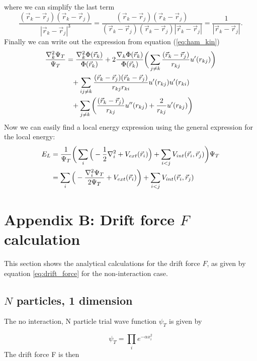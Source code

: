 \documentclass[norsk,a4paper,12pt]{article}
\begin{document}
where we can simplify the last term
\begin{equation}
\frac{(\vec{r}_k-\vec{r}_j)(\vec{r}_k-\vec{r}_j)}{|\vec{r}_k-\vec{r}_j|^3}=\frac{(\vec{r}_k - \vec{r}_j)(\vec{r}_k - \vec{r}_j)}{(\vec{r}_k - \vec{r}_j)(\vec{r}_k - \vec{r}_j)|\vec{r}_k - \vec{r}_j|}=\frac{1}{|\vec{r}_k - \vec{r}_j|}.
\end{equation}
Finally we can write out the expression from equation (\ref{eq:ham_kin}) 
\begin{align}
\frac{\nabla_k^2\Psi_T}{\Psi_T}&=\frac{\nabla_k^2\Phi(\vec{r}_k)}{\Phi(\vec{r}_k)} + 2\frac{\nabla_k\Phi(\vec{r}_k)}{\Phi(\vec{r}_k)}\bigg(\sum_{j\neq k}\frac{(\vec{r}_k-\vec{r}_j)}{r_{kj}}u'(r_{kj})\bigg)\notag\\
&\phantom{=}+\sum_{ij\neq k}\frac{(\vec{r}_k-\vec{r}_j)(\vec{r}_k-\vec{r}_j)}{r_{kj}r_{ki}}u'(r_{kj})u'(r_{ki})\\
&\phantom{=}+\sum_{j\neq k}\bigg(\frac{(\vec{r}_k-\vec{r}_j)}{r_{kj}}u''(r_{kj})+\frac{2}{r_{kj}}u'(r_{kj})\bigg)\notag
\end{align}
Now we can easily find a local energy expression using the general expression for the local energy:
\begin{align}
E_L&=\frac{1}{\Psi_T}\bigg(\sum_i\Big(-\frac{1}{2}\nabla_i^2+V_{ext}(\vec{r}_i)\Big) + \sum_{i<j}V_{int}(\vec{r}_i,\vec{r}_j)\bigg)\Psi_T\notag\\
&=\sum_i\Big(-\frac{\nabla_i^2\Psi_T}{2\Psi_T}+V_{ext}(\vec{r}_i)\bigg)+\sum_{i<j}V_{int}(\vec{r}_i,\vec{r}_j)
\end{align}

\section{Appendix B: Drift force $F$ calculation} \label{sec:appendix_b}

This section shows the analytical calculations for the drift force $F$, as given by equation \ref{eq:drift_force} for the non-interaction case.

\subsection{$N$ particles, 1 dimension}

The no interaction, N particle trial wave function $\psi_T$ is given by

\begin{equation}
\psi_T =	\prod_i e^{-\alpha x_i^2}
\end{equation}
The drift force F is then
\end{document}
